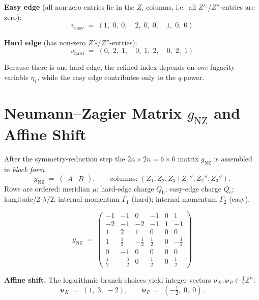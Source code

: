 \documentclass[11pt]{article}
\newcommand{\half}{\tfrac{1}{2}}
\newcommand{\hZ}{\tfrac{1}{2}\mathbb{Z}}
\begin{document}
\bigskip
\noindent\textbf{Easy edge} (all non-zero entries lie in the $Z_i$ columns, i.e.\ all $Z'$-/$Z''$-entries are zero):
\[
v_{\text{easy}} \;=\; (1,\; 0,\; 0,\quad 2,\; 0,\; 0,\quad 1,\; 0,\; 0)
\]

\noindent\textbf{Hard edge} (has non-zero $Z'$-/$Z''$-entries):
\[
v_{\text{hard}} \;=\; (0,\; 2,\; 1,\quad 0,\; 1,\; 2,\quad 0,\; 2,\; 1)
\]

Because there is one hard edge, the refined index depends on \emph{one} fugacity
variable $\eta_1$, while the easy edge contributes only to the $q$-power.

\section{Neumann--Zagier Matrix $g_{\mathrm{NZ}}$ and Affine Shift}

After the symmetry-reduction step the $2n \times 2n = 6\times 6$ matrix
$g_{\mathrm{NZ}}$ is assembled in \emph{block form}
\[
g_{\mathrm{NZ}} \;=\;
\left(\begin{array}{c|c}
  A & B
\end{array}\right),
\qquad
\text{columns: }
(Z_1, Z_2, Z_3 \mid Z_1'', Z_2'', Z_3'').
\]
Rows are ordered: meridian $\mu$; hard-edge charge $Q_{\mathrm{h}}$;
easy-edge charge $Q_{\mathrm{e}}$; longitude/2 $\lambda/2$;
internal momentum $\Gamma_1$ (hard); internal momentum $\Gamma_2$ (easy).

\[
g_{\mathrm{NZ}} \;=\;
\left(\begin{array}{rrr|rrr}
-1 & -1 &  0 & -1 & 0 &  1 \\
-2 & -1 & -2 & -1 & 1 & -1 \\
 1 &  2 &  1 &  0 & 0 &  0 \\\hline
 1 & \half & {-\half} & \half & 0 & {-\half} \\
 0 & -1 &  0 &  0 & 0 &  0 \\
 \half & {-\frac{3}{2}} & 0 & \half & 0 & \half
\end{array}\right)
\]

\medskip
\noindent\textbf{Affine shift.}
The logarithmic branch choices yield integer vectors
$\boldsymbol{\nu}_X, \boldsymbol{\nu}_P \in \hZ^n$:
\[
\boldsymbol{\nu}_X \;=\; (1,\; 3,\; -2),
\qquad
\boldsymbol{\nu}_P \;=\; \left(-\tfrac{1}{2},\; 0,\; 0\right).
\]

\noindent{}
\end{document}
